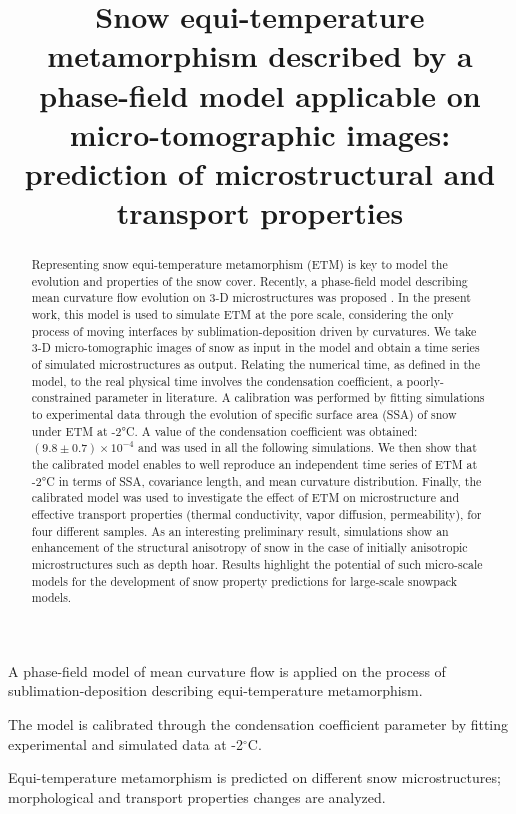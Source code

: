 \documentclass[draft,ms]{agujournal2019}
\begin{document}
\title{Snow equi-temperature metamorphism described by a phase-field model applicable on micro-tomographic images: prediction of microstructural and transport properties}





\begin{keypoints}
\item A phase-field model of mean curvature flow is applied on the process of sublimation-deposition describing equi-temperature metamorphism.
\item The model is calibrated through the condensation coefficient parameter by fitting experimental and simulated data at -2$^\circ$C.
\item Equi-temperature metamorphism is predicted on different snow microstructures; morphological and transport properties changes are analyzed.
\end{keypoints}


\begin{abstract}

Representing snow equi-temperature metamorphism (ETM) is key to model the evolution and properties of the snow cover. Recently, a phase-field model describing mean curvature flow evolution on 3-D microstructures was proposed \cite{bretin_phase-field_2019}. In the present work, this model is used to simulate ETM at the pore scale, considering the only process of moving interfaces by sublimation-deposition driven by curvatures. We take 3-D micro-tomographic images of snow as input in the model and obtain a time series of simulated microstructures as output. Relating the numerical time, as defined in the model, to the real physical time involves the condensation coefficient, a poorly-constrained parameter in literature. A calibration was performed by fitting simulations to experimental data through the evolution of specific surface area (SSA) of snow under ETM at -2°C. A value of the condensation coefficient was obtained: $(9.8\pm0.7)\times 10^{-4}$ and was used in all the following simulations. We then show that the calibrated model enables to well reproduce an independent time series of ETM at -2°C in terms of SSA, covariance length, and mean curvature distribution. Finally, the calibrated model was used to investigate the effect of ETM on microstructure and effective transport properties (thermal conductivity, vapor diffusion, permeability), for four different samples. As an interesting preliminary result, simulations show an enhancement of the structural anisotropy of snow in the case of initially anisotropic microstructures such as depth hoar. Results highlight the potential of such micro-scale models for the development of snow property predictions for large-scale snowpack models.

\end{abstract}
\end{document}
